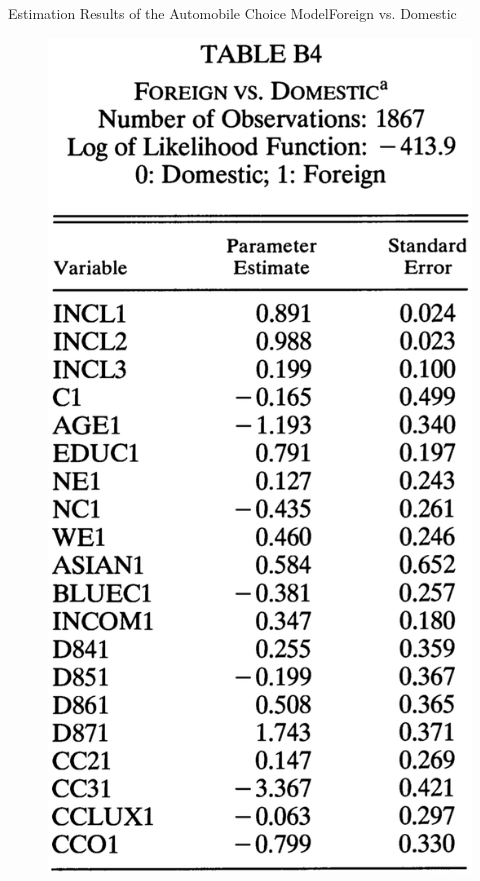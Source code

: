 \documentclass{beamer}
\begin{document}
\begin{frame}{Estimation Results of the Automobile Choice Model}{Foreign vs. Domestic}
	\begin{figure}[h]
		\centering
		\includegraphics[scale=0.32]{table_b4.png}
	\end{figure}
\end{frame}
\end{document}
